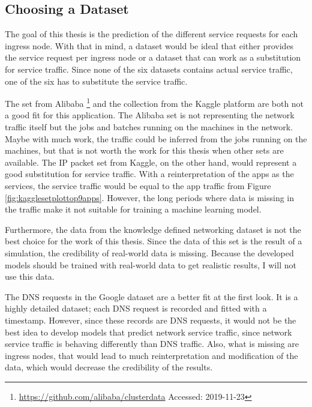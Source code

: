 \subsection{Choosing a Dataset}\label{chooseDataset}
The goal of this thesis is the prediction of the different service requests for each ingress node.
With that in mind, a dataset would be ideal that either provides the service request per ingress node or a dataset that can work as a substitution for service traffic.
Since none of the six datasets contains actual service traffic, one of the six has to substitute the service traffic.

The set from Alibaba \footnote{\url{https://github.com/alibaba/clusterdata} Accessed: 2019-11-23} and the collection from the Kaggle platform \cite{10.1007/978-3-319-95168-3_37} are both not a good fit for this application.
The Alibaba set is not representing the network traffic itself but the jobs and batches running on the machines in the network.
Maybe with much work, the traffic could be inferred from the jobs running on the machines, but that is not worth the work for this thesis when other sets are available.
The IP packet set from Kaggle, on the other hand, would represent a good substitution for service traffic.
With a reinterpretation of the apps as the services, the service traffic would be equal to the app traffic from Figure \ref{fig:kagglesetplottop9apps}.
However, the long periods where data is missing in the traffic make it not suitable for training a machine learning model.

Furthermore, the data from the knowledge defined networking dataset \cite{Mestres:2017:KN:3138808.3138810} is not the best choice for the work of this thesis.
Since the data of this set is the result of a simulation, the credibility of real-world data is missing.
Because the developed models should be trained with real-world data to get realistic results, I will not use this data.

The DNS requests in the Google dataset \cite{8506536} are a better fit at the first look.
It is a highly detailed dataset; each DNS request is recorded and fitted with a timestamp.
However, since these records are DNS requests, it would not be the best idea to develop models that predict network service traffic, since network service traffic is behaving differently than DNS traffic.
Also, what is missing are ingress nodes, that would lead to much reinterpretation and modification of the data, which would decrease the credibility of the results.

